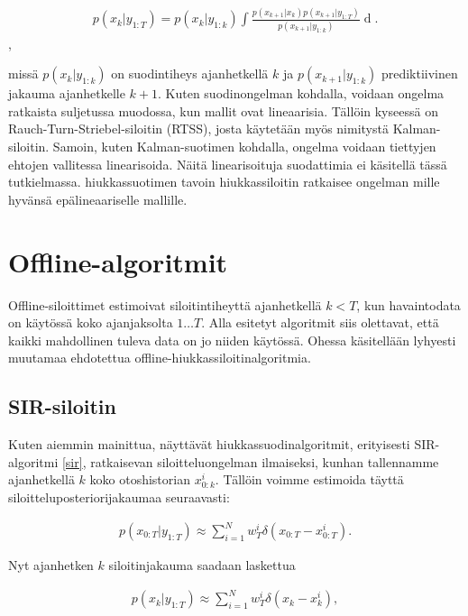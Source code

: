 \documentclass[
  12pt,
  a4paper, twoside]{book}
\begin{document}
\begin{align}\label{siloitin-ratkaisu}
p(x_k|y_{1:T}) = p(x_k|y_{1:k}) \int \frac{p(x_{k+1}|x_k)p(x_{k+1}|y_{1:T})}{p(x_{k+1}|y_{1:k})} \mathop{dx_{k+1}}.
\end{align},

missä \(p(x_k|y_{1:k})\) on suodintiheys ajanhetkellä \(k\) ja \(p(x_{k+1}|y_{1:k})\) prediktiivinen jakauma ajanhetkelle \(k+1\). Kuten suodinongelman kohdalla, voidaan ongelma ratkaista suljetussa muodossa, kun mallit ovat lineaarisia. Tällöin kyseessä on Rauch-Turn-Striebel-siloitin (RTSS), josta käytetään myös nimitystä Kalman-siloitin. Samoin, kuten Kalman-suotimen kohdalla, ongelma voidaan tiettyjen ehtojen vallitessa linearisoida. Näitä linearisoituja suodattimia ei käsitellä tässä tutkielmassa. hiukkassuotimen tavoin hiukkassiloitin ratkaisee ongelman mille hyvänsä epälineaariselle mallille.

\section{Offline-algoritmit}

Offline-siloittimet estimoivat siloitintiheyttä ajanhetkellä \(k<T\), kun havaintodata on käytössä koko ajanjaksolta \(1 \ldots T\). Alla esitetyt algoritmit siis olettavat, että kaikki mahdollinen tuleva data on jo niiden käytössä. Ohessa käsitellään lyhyesti muutamaa ehdotettua offline-hiukkassiloitinalgoritmia.

\subsection{SIR-siloitin}

Kuten aiemmin mainittua, näyttävät hiukkassuodinalgoritmit, erityisesti SIR-algoritmi \ref{sir}, ratkaisevan siloitteluongelman ilmaiseksi, kunhan tallennamme ajanhetkellä \(k\) koko otoshistorian \(x_{0:k}^i\). Tällöin voimme estimoida täyttä siloitteluposteriorijakaumaa seuraavasti:

\begin{align}\label{siloitin-posteriori}
p(x_{0:T}|y_{1:T}) \approx \sum_{i=1}^N w_T^i \delta (x_{0:T}-x_{0:T}^i).
\end{align}

Nyt ajanhetken \(k\) siloitinjakauma saadaan laskettua

\begin{align}\label{siloitin-posteriori-k}
p(x_{k}|y_{1:T}) \approx \sum_{i=1}^N w_T^i \delta (x_{k}-x_{k}^i),
\end{align}
\end{document}
